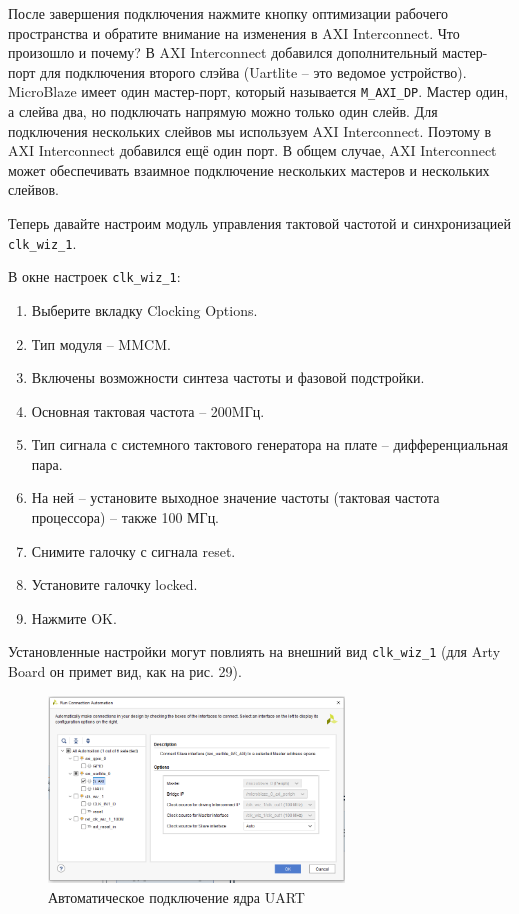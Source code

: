 \documentclass[a4paper,oneside ,10pt]{extreport}
\begin{document}
После завершения подключения нажмите кнопку оптимизации рабочего 
пространства и обратите внимание на изменения в AXI
Interconnect. Что произошло и почему? В AXI Interconnect добавился дополнительный 
мастер-порт для подключения второго слэйва (Uartlite – это ведомое устройство). 
MicroBlaze имеет один мастер-порт, который называется  \verb|M_AXI_DP|. Мастер один, 
а слейва два, но подключать напрямую можно только один слейв. Для подключения
нескольких слейвов мы используем AXI Interconnect. Поэтому в AXI Interconnect
добавился ещё один порт. В общем случае, AXI Interconnect может 
обеспечивать взаимное подключение нескольких мастеров и нескольких слейвов.

Теперь давайте настроим модуль управления тактовой 
частотой и синхронизацией  \verb|clk_wiz_1|. 

В окне настроек  \verb|clk_wiz_1|:
\begin{enumerate}
	\item Выберите вкладку Clocking Options.
	\item Тип модуля – MMCM.
	\item Включены возможности синтеза частоты и фазовой подстройки.
	\item Основная тактовая частота – 200MГц.
	\item Тип сигнала с системного тактового генератора на плате –
дифференциальная пара.
	\item На ней – установите выходное значение частоты (тактовая частота 
процессора) – также 100 МГц.
	\item Снимите галочку с сигнала reset.
	\item Установите галочку locked.
	\item Нажмите OK.
\end{enumerate}

Установленные настройки могут повлиять на внешний вид \verb|clk_wiz_1| (для Arty
Board он примет вид, как на рис. 29).

\begin{figure}[!ht]
	\centering
	\includegraphics[width=0.7\textwidth]{image/m_28.png}
	\caption{Автоматическое подключение ядра UART}
	\label{m_28}
\end{figure}
\end{document}
